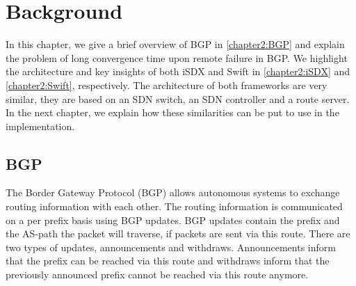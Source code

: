 
\chapter{\label{chapter2}Background}

In this chapter, we give a brief overview of BGP in \ref{chapter2:BGP} and explain the problem of long convergence time upon remote failure in BGP. We highlight the architecture and key insights of both iSDX and Swift in \ref{chapter2:iSDX} and \ref{chapter2:Swift}, respectively. The architecture of both frameworks are very similar, they are based on an SDN switch, an SDN controller and a route server. In the next chapter, we explain how these similarities can be put to use in the implementation.

\section{\label{chapter2:BGP}BGP}


The Border Gateway Protocol (BGP) allows autonomous systems to exchange routing information with each other. The routing information is communicated on a per prefix basis using BGP updates. BGP updates contain the prefix and the AS-path the packet will traverse, if packets are sent via this route. There are two types of updates, announcements and withdraws. Announcements inform that the prefix can be reached via this route and withdraws inform that the previously announced prefix cannot be reached via this route anymore. 

